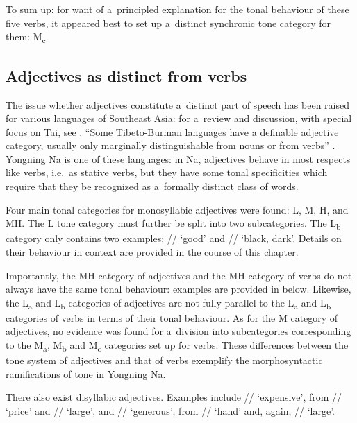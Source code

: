 To sum up: for want of a~principled explanation for the tonal behaviour of these five verbs, it appeared best to set up a~distinct synchronic tone category for them: M\textsubscript{c}.


\subsection{Adjectives as distinct from verbs}
\label{sec:adjectivesasdistinctfromverbs}

The issue whether adjectives constitute a~distinct part of speech has been raised for various languages of Southeast Asia: for a~review and discussion, with special focus on Tai, see \citet{post2008adjectives}. “Some Tibeto-Burman languages have a definable adjective category, usually only marginally distinguishable from nouns or from verbs” \citep[41]{delancey2015adjectival}. Yongning Na is one of these languages: in Na, adjectives behave in most respects like verbs, i.e.\ as stative verbs, but they have some tonal specificities which require that they be recognized as a~formally distinct class of words. 

Four main tonal categories for monosyllabic adjectives were found: L, M, H, and MH. The L tone
category must further be split into two subcategories. The L\textsubscript{b} category only contains
two examples: // ‘good’ and // ‘black, dark’. Details on their behaviour in context are
provided in the course of this chapter.

Importantly, the MH category of adjectives and the MH category of verbs do not always have the same
tonal behaviour: examples are provided in  below. Likewise, the L\textsubscript{a} and L\textsubscript{b} categories of
adjectives are not fully parallel to the L\textsubscript{a} and L\textsubscript{b} categories of verbs in terms of their tonal
behaviour. As for the M category of adjectives, no evidence was found for a~division into subcategories corresponding to the M\textsubscript{a}, M\textsubscript{b} and M\textsubscript{c} categories set up for verbs. These differences
between the tone system of adjectives and that of verbs exemplify the morphosyntactic
ramifications of tone in Yongning Na.

There also exist disyllabic adjectives. Examples include // ‘expensive’, from // ‘price’ and
// ‘large’, and // ‘generous’, from // ‘hand’ and, again, // ‘large’.

